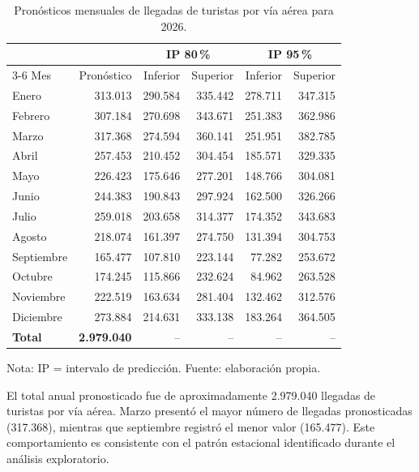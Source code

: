\documentclass[12pt]{article}
\begin{document}
\begin{table}[H]
    \centering
    \caption{Pronósticos mensuales de llegadas de 
    turistas por vía aérea para 2026.}
    \label{tab:pronosticos2026}
    \begin{tabular}{lrrrrr}
        \hline
        & & \multicolumn{2}{c}{IP 80\,\%} 
        & \multicolumn{2}{c}{IP 95\,\%} \\
        \cline{3-6}
        Mes & Pronóstico & Inferior & Superior 
        & Inferior & Superior \\
        \hline
        Enero      & 313.013 & 290.584 & 335.442 & 278.711 & 347.315 \\
        Febrero    & 307.184 & 270.698 & 343.671 & 251.383 & 362.986 \\
        Marzo      & 317.368 & 274.594 & 360.141 & 251.951 & 382.785 \\
        Abril      & 257.453 & 210.452 & 304.454 & 185.571 & 329.335 \\
        Mayo       & 226.423 & 175.646 & 277.201 & 148.766 & 304.081 \\
        Junio      & 244.383 & 190.843 & 297.924 & 162.500 & 326.266 \\
        Julio      & 259.018 & 203.658 & 314.377 & 174.352 & 343.683 \\
        Agosto     & 218.074 & 161.397 & 274.750 & 131.394 & 304.753 \\
        Septiembre & 165.477 & 107.810 & 223.144 & 77.282  & 253.672 \\
        Octubre    & 174.245 & 115.866 & 232.624 & 84.962  & 263.528 \\
        Noviembre  & 222.519 & 163.634 & 281.404 & 132.462 & 312.576 \\
        Diciembre  & 273.884 & 214.631 & 333.138 & 183.264 & 364.505 \\
        \hline
        \textbf{Total} & \textbf{2.979.040} & -- & -- & -- & -- \\
        \hline
    \end{tabular}

    \begin{flushleft}
        \footnotesize
        Nota: IP = intervalo de predicción. 
        Fuente: elaboración propia.
    \end{flushleft}
\end{table}

El total anual pronosticado fue de aproximadamente 
2.979.040 llegadas de turistas por vía aérea. Marzo 
presentó el mayor número de llegadas pronosticadas 
(317.368), mientras que septiembre registró el menor 
valor (165.477). Este comportamiento es consistente 
con el patrón estacional identificado durante el 
análisis exploratorio.
\end{document}
